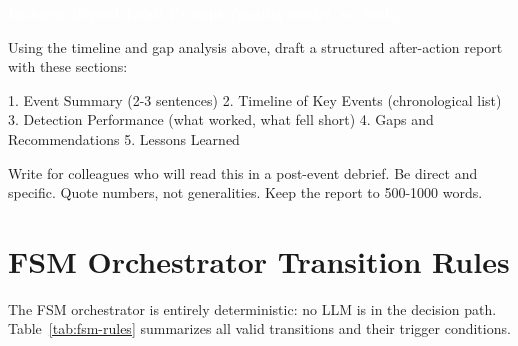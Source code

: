 \documentclass{article}
\newcommand{\promptlabel}[2][black!70]{%
  \begin{tcolorbox}[
    enhanced,
    arc=2.5pt,
    boxrule=0pt,
    colback=#1, colframe=#1,
    rounded corners=northwest, rounded corners=northeast,
    sharp corners=south,
    left=8pt, right=8pt, top=3pt, bottom=3pt,
    after skip=-0.6pt, before skip=10pt,
  ]
  \sffamily\small\bfseries\textcolor{white}{#2}
  \end{tcolorbox}%
}
\begin{document}
\promptlabel[promptquality]{Incident Report Draft Prompt \normalfont\textnormal{\textit{(quality model, no tools)}}}
\begin{promptbox}
Using the timeline and gap analysis above, draft a structured after-action
report with these sections:

1. Event Summary (2-3 sentences)
2. Timeline of Key Events (chronological list)
3. Detection Performance (what worked, what fell short)
4. Gaps and Recommendations
5. Lessons Learned

Write for colleagues who will read this in a post-event debrief. Be direct
and specific. Quote numbers, not generalities.
Keep the report to 500-1000 words.
\end{promptbox}

\FloatBarrier
\section{FSM Orchestrator Transition Rules}
\label{sec:appendix-fsm}

The FSM orchestrator is entirely deterministic: no LLM is in the
decision path.  Table~\ref{tab:fsm-rules} summarizes all valid
transitions and their trigger conditions.
\end{document}
